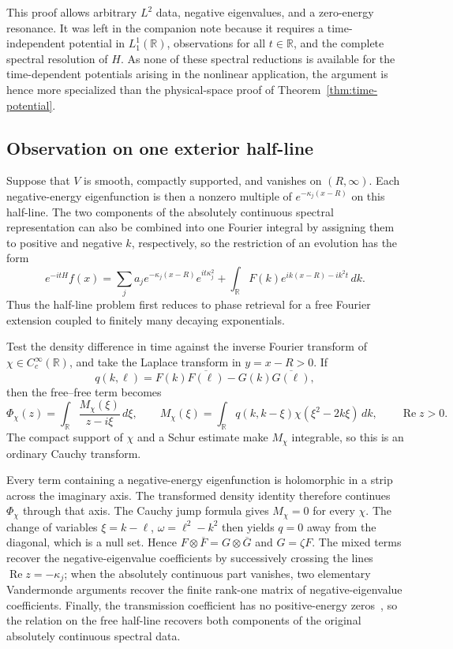 \documentclass[11pt]{amsart}
\theoremstyle{remark}
\newcommand{\R}{\mathbb R}
\newcommand{\1}{\mathbf 1}
\begin{document}
This proof allows arbitrary $L^2$ data, negative eigenvalues, and a
zero-energy resonance.  It was left in the companion note because it requires
a time-independent potential in $L^1_1(\R)$, observations for all
$t\in\R$, and the complete spectral resolution of $H$.  As none of these
spectral reductions is available for the time-dependent potentials arising
in the nonlinear application, the argument is hence more specialized
than the physical-space proof of Theorem~\ref{thm:time-potential}.

\subsection{Observation on one exterior half-line}

Suppose that $V$ is smooth, compactly supported, and vanishes on
$(R,\infty)$.  Each negative-energy eigenfunction is then a nonzero multiple
of $e^{-\kappa_j(x-R)}$ on this half-line.  The two components of the
absolutely continuous spectral representation can also be combined into one
Fourier integral by assigning them to positive and negative $k$, respectively,
so the restriction
of an evolution has the form
\[
 e^{-itH}f(x)
 =\sum_j a_j e^{-\kappa_j(x-R)}e^{it\kappa_j^2}
  +\int_\R F(k)e^{ik(x-R)-ik^2t}\,dk.
\]
Thus the half-line problem first reduces to phase retrieval for a free
Fourier extension coupled to finitely many decaying exponentials.

Test the density difference in time against the inverse Fourier transform of
$\chi\in C_c^\infty(\R)$, and take the Laplace transform in $y=x-R>0$.
If
\[
 q(k,\ell)=F(k)\overline{F(\ell)}
           -G(k)\overline{G(\ell)},
\]
then the free--free term becomes
\[
 \Phi_\chi(z)=\int_\R\frac{M_\chi(\xi)}{z-i\xi}\,d\xi,
 \qquad
 M_\chi(\xi)=\int_\R q(k,k-\xi)
                  \chi(\xi^2-2k\xi)\,dk,
 \qquad \operatorname{Re}z>0.
\]
The compact support of $\chi$ and a Schur estimate make $M_\chi$ integrable,
so this is an ordinary Cauchy transform.

Every term containing a negative-energy eigenfunction is holomorphic in a
strip across the imaginary axis.  The transformed density identity therefore continues
$\Phi_\chi$ through that axis.  The Cauchy jump formula gives
$M_\chi=0$ for every $\chi$.  The change of variables
$\xi=k-\ell$, $\omega=\ell^2-k^2$ then yields $q=0$ away from the diagonal,
which is a null set.  Hence $F\otimes\overline F=G\otimes\overline G$ and
$G=\zeta F$.  The mixed terms recover the negative-eigenvalue coefficients by
successively crossing the lines $\operatorname{Re}z=-\kappa_j$; when the
absolutely continuous part vanishes, two elementary Vandermonde arguments
recover the finite rank-one matrix of negative-eigenvalue coefficients.
Finally, the transmission coefficient has no positive-energy
zeros~\cite{DeiftTrubowitz}, so the relation on the free half-line recovers
both components of the original absolutely continuous spectral data.
\end{document}
